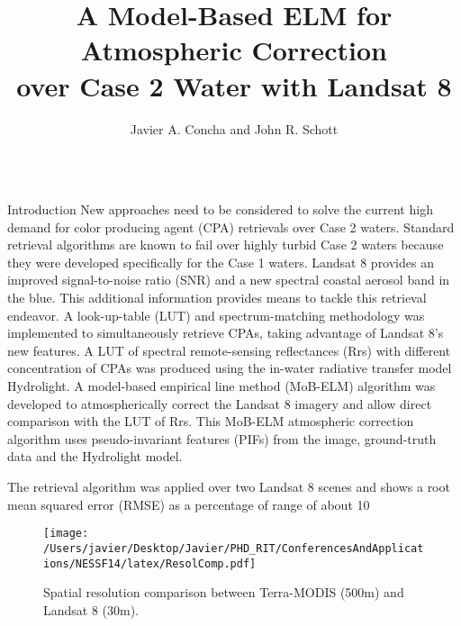 \documentclass{beamer}
\title{ \huge A Model-Based ELM for Atmospheric Correction \\over Case 2 Water with Landsat 8}
\author[]{Javier A. Concha and John R. Schott}
\institute[Rochester Institute of Technology]{Digital Imaging and Remote Sensing Laboratory, Chester F. Carlson Center for Imaging Science\\ Rochester Institute of Technology, Rochester, New York, USA}
\begin{document}
\begin{frame}{} 
  \begin{columns}[t]
    

\begin{column}{.3\linewidth}
\begin{block}{Introduction}
\justifying\small New approaches need to be considered to solve the current high demand for color producing agent (CPA) retrievals over Case 2 waters. Standard retrieval algorithms are known to fail over highly turbid Case 2 waters because they were developed specifically for the Case 1 waters. Landsat 8 provides an improved signal-to-noise ratio (SNR) and a new spectral coastal aerosol band in the blue. This additional information provides means to tackle this retrieval endeavor. A look-up-table (LUT) and spectrum-matching methodology was implemented to simultaneously retrieve CPAs, taking advantage of Landsat 8's new features. A LUT of spectral remote-sensing reflectances (Rrs) with different concentration of CPAs was produced using the in-water radiative transfer model Hydrolight. A model-based empirical line method (MoB-ELM) algorithm was developed to atmospherically correct the Landsat 8 imagery and allow direct comparison with the LUT of Rrs. This MoB-ELM atmospheric correction algorithm uses pseudo-invariant features (PIFs) from the image, ground-truth data and the Hydrolight model.

The retrieval algorithm was applied over two Landsat 8 scenes and shows a root mean squared error (RMSE) as a percentage of range of about 10%
\\
\begin{center}
\begin{figure}[H]
\centering
  \texttt{[image: /Users/javier/Desktop/Javier/PHD\_RIT/ConferencesAndApplications/NESSF14/latex/ResolComp.pdf]}
  \caption{Spatial resolution comparison between Terra-MODIS (500m) and Landsat 8 (30m). \label{fig:resol} } 
\end{figure}
\end{center}
\end{block}
      

\end{column}
\end{columns}
\end{frame}
\end{document}
